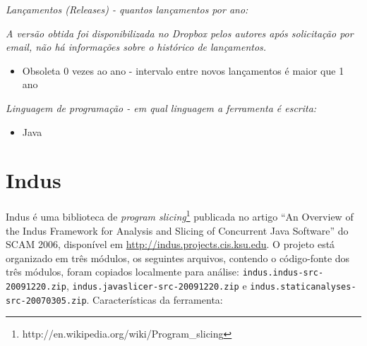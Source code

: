 \begin{description}

  \item {\it Lançamentos ({\it Releases}) - quantos lançamentos por ano:}

    {\it A versão obtida foi disponibilizada no Dropbox pelos autores após solicitação
    por email, não há informações sobre o histórico de lançamentos.}

    \begin{itemize}
      \item Obsoleta $0$ vezes ao ano - intervalo entre novos lançamentos é maior que 1 ano
    \end{itemize}

  \item {\it Linguagem de programação - em qual linguagem a ferramenta é escrita:}
    \begin{itemize}
      \item Java
    \end{itemize}

\end{description}

\section{Indus}

Indus é uma biblioteca de {\it program
slicing}\footnote{http://en.wikipedia.org/wiki/Program\_slicing} publicada no
artigo ``An Overview of the Indus Framework for Analysis and Slicing of
Concurrent Java Software'' do SCAM 2006, disponível em
\url{http://indus.projects.cis.ksu.edu}.  O projeto está organizado em três
módulos, os seguintes arquivos, contendo o código-fonte dos três módulos,
foram copiados localmente para análise:
\texttt{indus.indus-src-20091220.zip},
\texttt{indus.javaslicer-src-20091220.zip} e
\texttt{indus.staticanalyses-src-20070305.zip}. Características da ferramenta:

